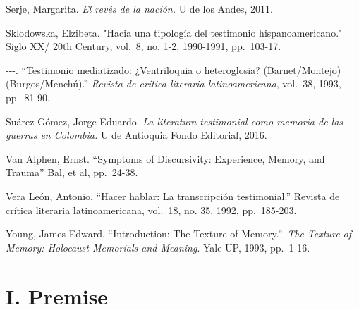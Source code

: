\documentclass[
  11pt,
,
onecolumn,
openany
]{book}
\begin{document}
Serje, Margarita. \emph{El revés de la nación.} U de los Andes, 2011.

Sklodowska, Elzibeta. "Hacia una tipología del testimonio hispanoamericano."
Siglo XX/ 20th Century, vol.~8, no. 1-2, 1990-1991, pp.~103-17.

-\/-\/-. ``Testimonio mediatizado: ¿Ventriloquia o heteroglosia?
(Barnet/Montejo) (Burgos/Menchú).'' \emph{Revista de crítica literaria
latinoamericana}, vol.~38, 1993, pp.~81-90.

Suárez Gómez, Jorge Eduardo. \emph{La literatura testimonial como memoria de
las guerras en Colombia.} U de Antioquia Fondo Editorial, 2016.

Van Alphen, Ernst. ``Symptoms of Discursivity: Experience, Memory, and
Trauma'' Bal, et al, pp.~24-38.

Vera León, Antonio. ``Hacer hablar: La transcripción testimonial.'' Revista de
crítica literaria latinoamericana, vol.~18, no. 35, 1992, pp.~185-203.

Young, James Edward. ``Introduction: The Texture of Memory.''~\emph{The
Texture of Memory: Holocaust Memorials and Meaning}. Yale UP, 1993, pp.~1-16.

\hypertarget{i.-premise}{%
\chapter{I. Premise}\label{i.-premise}}
\end{document}
